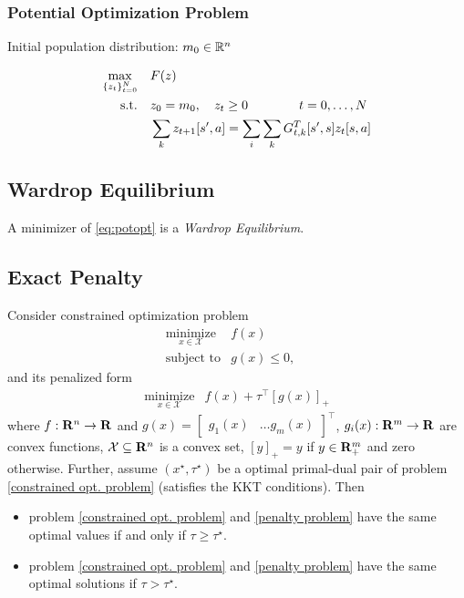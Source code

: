 \subsubsection{Potential Optimization Problem}
Initial population distribution: $m_0 \in \mathbb{R}^n$

\begin{align}
\max_{\{z_t\}_{t=0}^N} & \quad F(z) \label{eq:potopt} \\
\text{s.t.} & \quad z_0 = m_0, \quad z_t \geq 0  \qquad \qquad t=0,\dots, N \notag \\
& \quad \sum_k z_{t+1}[s',a] = \sum_i \sum_k G_{t,k}^T[s',s] z_t[s,a] \notag
\end{align}
\subsection{Wardrop Equilibrium}
\begin{theorem}
A minimizer of \eqref{eq:potopt} is a \emph{Wardrop Equilibrium}.  
\end{theorem}
\subsection{Exact Penalty}
\begin{theorem}
Consider constrained optimization problem
\begin{equation}
 \begin{array}{ll}
  \underset{x\in\mathcal{X}}{\mbox{minimize}} & f(x)\\
   \mbox{subject to} & g(x)\leq 0,\quad 
     \end{array}
     \label{constrained opt. problem}
\end{equation}
and its penalized form 
\begin{equation}
 \begin{array}{ll}
  \underset{x\in\mathcal{X}}{\mbox{minimize}} & f(x)+\tau^\top [g(x)]_+
     \end{array}
     \label{penalty problem}
\end{equation}
where \(f:{\relax{\bf R}}^n\to {\relax{\bf R}}\) and \(g(x)=\begin{bmatrix} g_1(x) & \ldots g_m(x) \end{bmatrix}^\top\), \(g_i(x):{\relax{\bf R}}^m\to{\relax{\bf R}}\) are convex functions, \(\mathcal{X}\subseteq{\relax{\bf R}}^n\) is a convex set, \([y]_+=y\) if \(y\in{\relax{\bf R}}^m_+\) and zero otherwise. Further, assume \((x^\star, \tau^\star)\) be a optimal primal-dual pair of problem \eqref{constrained opt. problem} (satisfies the KKT conditions). Then 
\begin{itemize}
\item problem \eqref{constrained opt. problem} and \eqref{penalty problem} have the same optimal values if and only if \(\tau\geq \tau^\star\).
\item problem \eqref{constrained opt. problem} and \eqref{penalty problem} have the same optimal solutions if \(\tau > \tau^\star\).
\end{itemize}


\end{theorem}